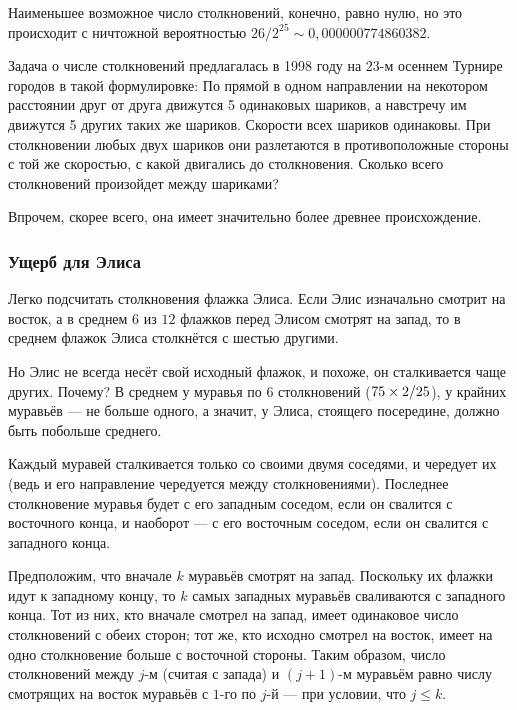 {\sloppy 

Наименьшее возможное число столкновений, конечно, равно нулю, но это происходит с ничтожной вероятностью $26/2^{25} \sim 0{,}000000774860382$.

}

\begin{addedbytheeditors}
    Задача о числе столкновений предлагалась в 1998 году на 23-м осеннем Турнире городов в такой формулировке:
По прямой в одном направлении на некотором расстоянии друг от друга движутся 5 одинаковых шариков, а навстречу им движутся 5 других таких же шариков. Скорости всех шариков одинаковы. При столкновении любых двух шариков они разлетаются в противоположные стороны с той же скоростью, с какой двигались до столкновения. Сколько всего столкновений произойдет между шариками?

Впрочем, скорее всего, она имеет значительно более древнее происхождение. 

\end{addedbytheeditors}

\subsubsection*{Ущерб для Элиса}

Легко подсчитать столкновения флажка Элиса.
Если Элис изначально смотрит на восток, а в среднем $6$ из $12$ флажков перед Элисом смотрят на запад, то  в среднем  флажок Элиса столкнётся с шестью другими.

Но Элис не всегда несёт свой исходный флажок, и похоже, он сталкивается чаще других.
Почему?
В среднем у муравья по 6 столкновений ($75 \z\times 2/25$), у крайних муравьёв --- не больше одного, а значит, у Элиса, стоящего посередине, должно быть побольше среднего.

Каждый муравей сталкивается только со своими двумя соседями,
и чередует их (ведь и его направление чередуется между столкновениями).
Последнее столкновение муравья будет с его западным соседом, если он свалится с восточного конца, и наоборот --- с его восточным соседом, если он свалится с западного конца.

Предположим, что вначале $k$ муравьёв смотрят на запад.
Поскольку их флажки идут к западному концу, то $k$ самых западных муравьёв сваливаются с западного конца.
Тот из них, кто вначале смотрел на запад, имеет одинаковое число столкновений с обеих сторон;
тот же, кто исходно смотрел на восток, имеет на одно столкновение больше с восточной стороны.
Таким образом, число столкновений между $j$-м  (считая с запада) и 
$(j+1)$-м муравьём равно числу смотрящих на восток муравьёв с $1$-го по $j$-й --- при условии, что $j\le k$.

